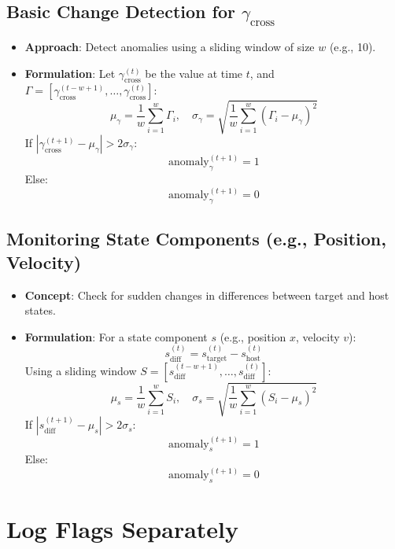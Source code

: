 \documentclass{article}
\begin{document}
\subsection{Basic Change Detection for $\gamma_{\text{cross}}$}
\begin{itemize}
    \item \textbf{Approach}: Detect anomalies using a sliding window of size $w$ (e.g., 10).
    \item \textbf{Formulation}:  
    Let $\gamma_{\text{cross}}^{(t)}$ be the value at time $t$, and $\Gamma = [\gamma_{\text{cross}}^{(t-w+1)}, \dots, \gamma_{\text{cross}}^{(t)}]$:
    \[
    \mu_{\gamma} = \frac{1}{w} \sum_{i=1}^{w} \Gamma_i, \quad \sigma_{\gamma} = \sqrt{\frac{1}{w} \sum_{i=1}^{w} (\Gamma_i - \mu_{\gamma})^2}
    \]
    If $|\gamma_{\text{cross}}^{(t+1)} - \mu_{\gamma}| > 2 \sigma_{\gamma}$:
    \[
    \text{anomaly}_{\gamma}^{(t+1)} = 1
    \]
    Else:
    \[
    \text{anomaly}_{\gamma}^{(t+1)} = 0
    \]
\end{itemize}

\subsection{Monitoring State Components (e.g., Position, Velocity)}
\begin{itemize}
    \item \textbf{Concept}: Check for sudden changes in differences between target and host states.
    \item \textbf{Formulation}:  
    For a state component $s$ (e.g., position $x$, velocity $v$):
    \[
    s_{\text{diff}}^{(t)} = s_{\text{target}}^{(t)} - s_{\text{host}}^{(t)}
    \]
    Using a sliding window $S = [s_{\text{diff}}^{(t-w+1)}, \dots, s_{\text{diff}}^{(t)}]$:
    \[
    \mu_s = \frac{1}{w} \sum_{i=1}^{w} S_i, \quad \sigma_s = \sqrt{\frac{1}{w} \sum_{i=1}^{w} (S_i - \mu_s)^2}
    \]
    If $|s_{\text{diff}}^{(t+1)} - \mu_s| > 2 \sigma_s$:
    \[
    \text{anomaly}_s^{(t+1)} = 1
    \]
    Else:
    \[
    \text{anomaly}_s^{(t+1)} = 0
    \]
\end{itemize}

\section{Log Flags Separately}
\end{document}
